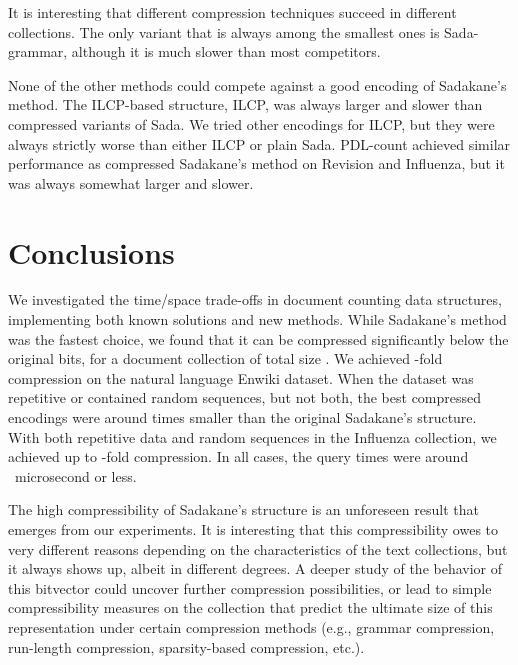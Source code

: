 \documentclass[11pt]{llncs}
\newcommand{\PDLcount}{\textsf{PDL-count}} \newcommand{\SadaR}{\textsf{Sada-RR}} \newcommand{\SadaPG}{\textsf{Sada-P-G}} \newcommand{\SadaPR}{\textsf{Sada-P-RR}} \newcommand{\SadaRG}{\textsf{Sada-RR-G}} \newcommand{\SadaRR}{\textsf{Sada-RR-RR}} \newcommand{\SadaG}{\textsf{Sada-grammar}} \newcommand{\sada}{\textsf{Sada}} \newcommand{\sadaR}{\textsf{Sada-RS}} \newcommand{\sadaRS}{\textsf{Sada-RS-S}} \newcommand{\sadaD}{\textsf{Sada-RD}} \newcommand{\sadaDS}{\textsf{Sada-RD-S}} \newcommand{\sadaS}{\textsf{Sada-S-S}} \newcommand{\sadaSS}{\textsf{Sada-S}} \newcommand{\wt}{\textsf{ILCP}}
\newcommand{\Enwiki}{\textsf{Enwiki}}
\newcommand{\Revision}{\textsf{Revision}}
\newcommand{\Influenza}{\textsf{Influenza}}
\begin{document}
It is interesting that different compression techniques succeed in different
collections. The only variant that is always among the smallest ones is
\SadaG, although it is much slower than most competitors.

None of the other methods could compete against a good encoding of Sadakane's method. The ILCP-based structure, \wt, was always larger and slower than compressed variants of \sada. We tried other encodings for ILCP, but they were always strictly worse than either \wt{} or plain \sada. \PDLcount{} achieved similar performance as compressed Sadakane's method on \Revision{} and \Influenza{}, but it was always somewhat larger and slower.


\section{Conclusions}\label{section:conclusions}

We investigated the time/space trade-offs in document counting data structures, implementing both known solutions and new methods. While Sadakane's method was the fastest choice, we found that it can be compressed significantly below the original  bits, for a document collection of total size . We achieved \nobreakdash-fold compression on the natural language \Enwiki{} dataset. When the dataset was repetitive or contained random sequences, but not both, the best compressed encodings were around  times smaller than the original Sadakane's structure. With both repetitive data and random sequences in the \Influenza{} collection, we achieved up to \nobreakdash-fold compression. In all cases, the query times were around ~microsecond or less.

The high compressibility of Sadakane's structure is an unforeseen result that
emerges from our experiments. It is interesting that this compressibility owes
to very different reasons depending on the characteristics of the text
collections, but it always shows up, albeit in different degrees. 
A deeper study of the behavior of this
bitvector could uncover further compression possibilities, or lead to simple
compressibility measures on the collection that predict the ultimate size of
this representation under certain compression methods (e.g., grammar
compression, run-length compression, sparsity-based compression, etc.).

\clearpage



\end{document}
